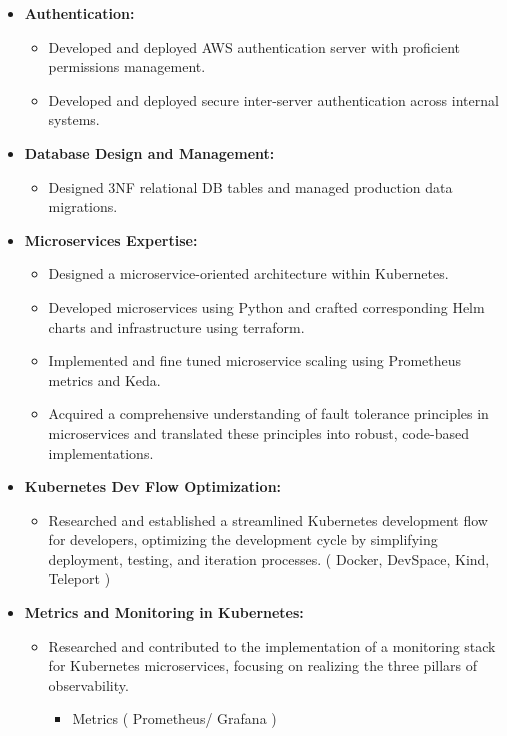 \documentclass[10pt,a4paper]{altacv}
\begin{document}
\begin{itemize}
\item \textbf{Authentication:}
  \begin{itemize}
    \item Developed and deployed AWS authentication server with proficient permissions management.
    \item Developed and deployed secure inter-server authentication across internal systems.
  \end{itemize}
\item \textbf{Database Design and Management:}
  \begin{itemize}
    \item Designed 3NF relational DB tables  and managed production data migrations.
  \end{itemize}
\item \textbf{Microservices Expertise:}
  \begin{itemize}
    \item Designed a microservice-oriented architecture within Kubernetes.
    \item Developed microservices using Python and crafted corresponding Helm charts and infrastructure using terraform.
    \item Implemented and fine tuned microservice scaling using Prometheus metrics and Keda.
    \item Acquired a comprehensive understanding of fault tolerance principles in microservices and translated these principles into robust, code-based implementations.
  \end{itemize}
\item \textbf{Kubernetes Dev Flow Optimization:}
  \begin{itemize}
    \item Researched and established a streamlined Kubernetes development flow for developers, optimizing the development cycle by simplifying deployment, testing, and iteration processes. ( Docker, DevSpace, Kind, Teleport ) 
  \end{itemize}
\item \textbf{Metrics and Monitoring in Kubernetes:}
  \begin{itemize}
    \item Researched and contributed to the implementation of a monitoring stack for Kubernetes microservices, focusing on realizing the three pillars of observability.
    \begin{itemize}
        \item Metrics ( Prometheus/ Grafana )

\end{itemize}
\end{itemize}
\end{itemize}
\end{document}
